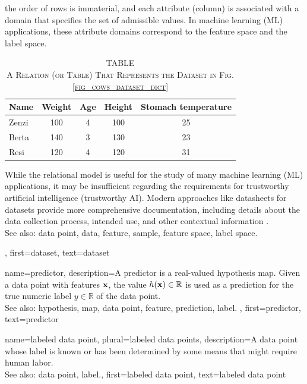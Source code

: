 {{{		the order of rows is immaterial, and each attribute (column) is associated with a 
		domain that specifies the set of admissible values. In machine learning (ML) applications, 
		these attribute domains correspond to the feature space and the label space.
		\begin{table}[H]
			\caption*{
				\centering 
				\scshape TABLE \thetable \\[0.5ex]
				\scshape A Relation (or Table) That Represents the Dataset in Fig. \ref{fig_cows_dataset_dict} 
			}
			\label{tab:cowdata_dict} 
			\centering
			\begin{tabular}{lcccc}
				\hline
				\textbf{Name} & \textbf{Weight} & \textbf{Age} & \textbf{Height} & \textbf{Stomach temperature} \\
				\hline
				Zenzi & 100 & 4 & 100 & 25 \\
				Berta & 140 & 3 & 130 & 23 \\
				Resi  & 120 & 4 & 120 & 31 \\
				\hline
			\end{tabular}
		\end{table}
 		While the relational model is useful for the study of many machine learning (ML) applications, 
		it may be insufficient regarding the requirements for trustworthy artificial intelligence (trustworthy AI). Modern 
 		approaches like datasheets for datasets provide more comprehensive 
 		documentation, including details about the data collection process, intended 
 		use, and other contextual information \cite{DatasheetData2021}.
 		\\
		See also: data point, data, feature, sample, feature space, label space.},
	first={dataset},
	text={dataset}  
}

{name={predictor},
	description={A predictor is a real-valued hypothesis map. 
		Given a data point with features ${\bf x}$, the value 
		$h({\bf x}) \in \mathbb{R}$ is used as a prediction for the true 
		numeric label $y \in \mathbb{R}$ of the data point.
				\\
		See also: hypothesis, map, data point, feature, prediction, label. },
	first={predictor},
	text={predictor}  
}

{name={labeled data point}, plural={labeled data points},
 	description={A data point whose label is known or has been determined 
 		by some means that might require human labor.
			\\
		See also: data point, label.},
 	first={labeled data point},
 	text={labeled data point}  
}

}

